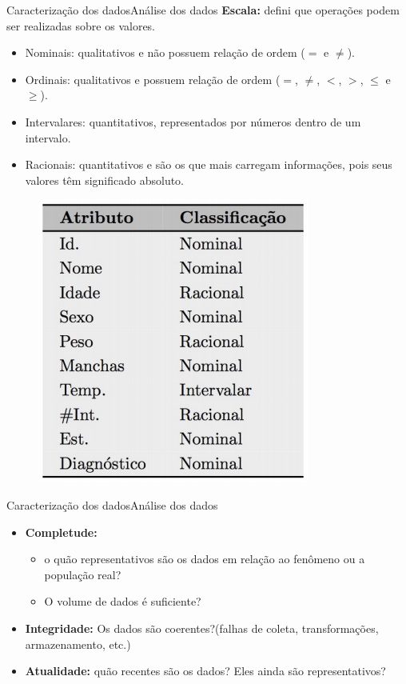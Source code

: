 \documentclass[t]{beamer}
\begin{document}
\begin{ftst}{Caracterização dos dados}{Análise dos dados}
\textbf{Escala:} defini que operações podem ser realizadas sobre os valores.

\begin{itemize}
    \item Nominais: qualitativos e não possuem relação de ordem ($=$ e $\neq$).
    \item Ordinais: qualitativos e possuem relação de ordem ($=$, $\neq$, $<$, $>$, $\leq$ e $\geq$).
    \item Intervalares: quantitativos, representados por números dentro de um intervalo.
    \item Racionais: quantitativos e são os que mais carregam informações, pois seus valores têm significado absoluto.
\end{itemize}

\begin{figure}
    \centering
    \includegraphics[scale=0.4]{Figuras/slide01_03.jpg}
\end{figure}



\end{ftst}


\begin{ftst}{Caracterização dos dados}{Análise dos dados}

\begin{itemize}
    \item \textbf{Completude:} 
    \begin{itemize}
        \item o quão representativos são os dados em relação ao fenômeno ou a população real?
        \item O volume de dados é suficiente?
    \end{itemize}
    \vone
    \item  \textbf{Integridade:} Os dados são coerentes?(falhas de coleta, transformações, armazenamento, etc.)
    \vone
    \item  \textbf{Atualidade:} quão recentes são os dados? Eles ainda são representativos?
\end{itemize}
\end{ftst}

\end{document}
